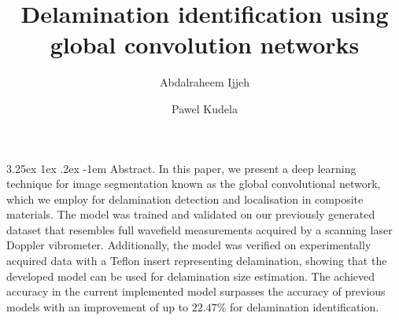 \documentclass[runningheads]{llncs}
\makeatletter
\renewcommand\paragraph{\@startsection{paragraph}{4}{\z@}%
                                    {3.25ex \@plus1ex \@minus.2ex}%
                                    {-1em}%
                                    {\normalfont\normalsize\bfseries}}
\makeatother
\begin{document}
%
\title{Delamination identification using global convolution networks}
%
%
\author{Abdalraheem Ijjeh \and
Pawel Kudela}
%
%
%
\maketitle              %
%
\paragraph{Abstract.}
In this paper, we present a deep learning technique for image segmentation known as the global convolutional network, which we employ for delamination detection and localisation in composite materials.
The model was trained and validated on our previously generated dataset that resembles full wavefield measurements acquired by a scanning laser Doppler vibrometer.
Additionally, the model was verified on experimentally acquired data with a Teflon insert representing delamination, showing that the developed model can be used for delamination size estimation.
The achieved accuracy in the current implemented model surpasses the accuracy of previous models with an improvement of up to $22.47\%$ for delamination identification.


%

\end{document}
